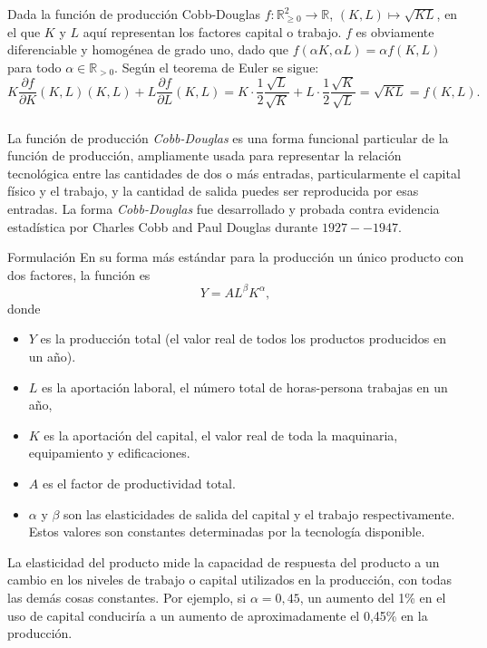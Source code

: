 \begin{frame}
\begin{example}
Dada la función de producción Cobb-Douglas $f\colon\mathds{R}^{2}_{\geq0}\rightarrow\mathds{R}$, $\left(K,L\right)\mapsto\sqrt{KL}$, en el que $K$ y $L$ aquí representan los factores capital o trabajo. $f$ es obviamente diferenciable y homogénea de grado uno, dado que $f\left(\alpha K,\alpha L\right)=\alpha f\left(K,L\right)$ para todo $\alpha\in\mathds{R}_{>0}$. Según el teorema de Euler se sigue: \[ K\frac{\partial f}{\partial K}\left(K, L\right)\left(K,L\right)+L\frac{\partial f}{\partial L}\left(K,L\right)=K\cdot\frac{1}{2}\frac{\sqrt{L}}{\sqrt{K}}+L\cdot\frac{1}{2}\frac{\sqrt{K}}{\sqrt{L}}=\sqrt{KL}=f\left(K,L\right). \]
\end{example}
\end{frame}

\begin{frame}[t]
\frametitle{\secname}

La función de producción \emph{Cobb-Douglas} es una forma funcional particular de la función de producción, ampliamente usada para representar la relación tecnológica entre las cantidades de dos o más entradas, particularmente el capital físico y el trabajo, y la cantidad de salida puedes ser reproducida por esas entradas. La forma \emph{Cobb-Douglas} fue desarrollado y probada contra evidencia estadística por Charles Cobb and Paul Douglas durante $1927--1947$.

\begin{block}{Formulación}
En su forma más estándar para la producción un único producto con dos factores, la función es \[ Y=AL^{\beta}K^{\alpha}, \] donde
\begin{itemize}
	\item $Y$ es la producción total (el valor real de todos los productos producidos en un año).
	\item $L$ es la aportación laboral, el número total de horas-persona trabajas en un año,
	\item $K$ es la aportación del capital, el valor real de toda la maquinaria, equipamiento y edificaciones.
	\item $A$ es el factor de productividad total.
	\item $\alpha$ y $\beta$ son las elasticidades de salida del capital y el trabajo respectivamente. Estos valores son constantes determinadas por la tecnología disponible.
\end{itemize}
La elasticidad del producto mide la capacidad de respuesta del producto a un cambio en los niveles de trabajo o capital utilizados en la producción, con todas las demás cosas constantes. Por ejemplo, si $\alpha=0,45$, un aumento del 1\% en el uso de capital conduciría a un aumento de aproximadamente el 0,45\% en la producción.
\end{block}
\end{frame}

